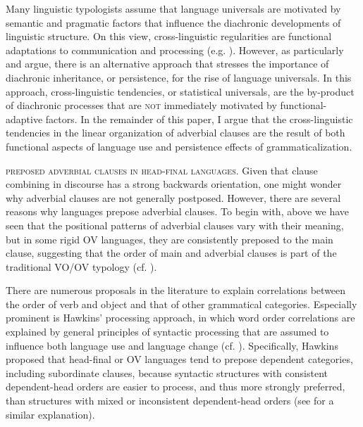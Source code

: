 \documentclass[output=paper]{langsci/langscibook}
\begin{document}
Many linguistic typologists assume that language universals are motivated by semantic and pragmatic factors that influence the diachronic developments of linguistic structure. On this view, cross-linguistic regularities are functional adaptations to communication and processing (e.g. \citealt{FoleyVanValin1984,Dik1989,Hawkins2004}). However, as particularly  and  argue, there is an alternative approach that stresses the importance of diachronic inheritance, or persistence, for the rise of language universals. In this approach, cross-linguistic tendencies, or statistical universals, are the by-product of diachronic processes that are \textsc{not} immediately motivated by functional-adaptive factors. In the remainder of this paper, I argue that the cross-linguistic tendencies in the linear organization of adverbial clauses are the result of both functional aspects of language use and persistence effects of grammaticalization. 

\textsc{preposed} \textsc{adverbial} \textsc{clauses} \textsc{in} \textsc{head-final} \textsc{languages}. Given that clause combining in discourse has a strong backwards orientation, one might wonder why adverbial clauses are not generally postposed. However, there are several reasons why languages prepose adverbial clauses. To begin with, above we have seen that the positional patterns of adverbial clauses vary with their meaning, but in some rigid OV languages, they are consistently preposed to the main clause, suggesting that the order of main and adverbial clauses is part of the traditional VO/OV typology (cf. \citealt{Diessel2001}).

There are numerous proposals in the literature to explain correlations between the order of verb and object and that of other grammatical categories. Especially prominent is Hawkins’ processing approach, in which word order correlations are explained by general principles of syntactic processing that are assumed to influence both language use and language change (cf. \citealt{Hawkins1994, Hawkins2004}). Specifically, Hawkins proposed that head-final or OV languages tend to prepose dependent categories, including subordinate clauses, because syntactic structures with consistent dependent-head orders are easier to process, and thus more strongly preferred, than structures with mixed or inconsistent dependent-head orders (see \citealt{Dryer1992} for a similar explanation).
\end{document}
